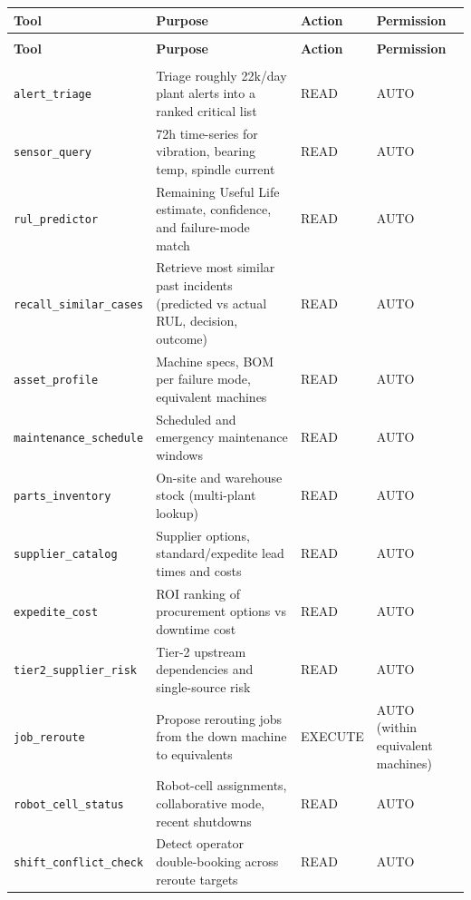 \documentclass[11pt,a4paper]{article}
\newcommand{\tool}[1]{\texttt{#1}}
\begin{document}
\small
\begin{longtable}{>{\raggedright\arraybackslash}p{3.3cm} >{\raggedright\arraybackslash}p{6.4cm} >{\raggedright\arraybackslash}p{1.7cm} >{\raggedright\arraybackslash}p{2.9cm}}
\toprule
\textbf{Tool} & \textbf{Purpose} & \textbf{Action} & \textbf{Permission} \\
\midrule
\endfirsthead
\multicolumn{4}{l}{\small\itshape Tools \& Actions (continued)}\\[2pt]
\toprule
\textbf{Tool} & \textbf{Purpose} & \textbf{Action} & \textbf{Permission} \\
\midrule
\endhead
\midrule
\multicolumn{4}{r}{\small\itshape continued on next page}\\
\endfoot
\bottomrule
\endlastfoot
\tool{alert\_triage} & Triage roughly 22k/day plant alerts into a ranked critical list & READ & AUTO \\
\tool{sensor\_query} & 72h time-series for vibration, bearing temp, spindle current & READ & AUTO \\
\tool{rul\_predictor} & Remaining Useful Life estimate, confidence, and failure-mode match & READ & AUTO \\
\tool{recall\_similar\_cases} & Retrieve most similar past incidents (predicted vs actual RUL, decision, outcome) & READ & AUTO \\
\tool{asset\_profile} & Machine specs, BOM per failure mode, equivalent machines & READ & AUTO \\
\tool{maintenance\_schedule} & Scheduled and emergency maintenance windows & READ & AUTO \\
\tool{parts\_inventory} & On-site and warehouse stock (multi-plant lookup) & READ & AUTO \\
\tool{supplier\_catalog} & Supplier options, standard/expedite lead times and costs & READ & AUTO \\
\tool{expedite\_cost} & ROI ranking of procurement options vs downtime cost & READ & AUTO \\
\tool{tier2\_supplier\_risk} & Tier-2 upstream dependencies and single-source risk & READ & AUTO \\
\tool{job\_reroute} & Propose rerouting jobs from the down machine to equivalents & EXECUTE & AUTO (within equivalent machines) \\
\tool{robot\_cell\_status} & Robot-cell assignments, collaborative mode, recent shutdowns & READ & AUTO \\
\tool{shift\_conflict\_check} & Detect operator double-booking across reroute targets & READ & AUTO \\

\end{longtable}
\end{document}
